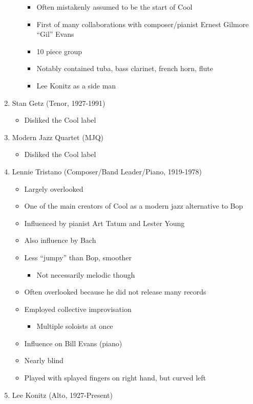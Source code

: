 \documentclass[]{article}
\providecommand{\tightlist}{%
  \setlength{\itemsep}{0pt}\setlength{\parskip}{0pt}}
\begin{document}
\begin{enumerate}
\begin{itemize}
    \begin{itemize}
    \tightlist
    \item
      Often mistakenly assumed to be the start of Cool
    \item
      First of many collaborations with composer/pianist Ernest Gilmore
      ``Gil'' Evans
    \item
      10 piece group
    \item
      Notably contained tuba, bass clarinet, french horn, flute
    \item
      Lee Konitz as a side man
    \end{itemize}
  \end{itemize}
\item
  Stan Getz (Tenor, 1927-1991)

  \begin{itemize}
  \tightlist
  \item
    Disliked the Cool label
  \end{itemize}
\item
  Modern Jazz Quartet (MJQ)

  \begin{itemize}
  \tightlist
  \item
    Disliked the Cool label
  \end{itemize}
\item
  Lennie Tristano (Composer/Band Leader/Piano, 1919-1978)

  \begin{itemize}
  \tightlist
  \item
    Largely overlooked
  \item
    One of the main creators of Cool as a modern jazz alternative to Bop
  \item
    Influenced by pianist Art Tatum and Lester Young
  \item
    Also influence by Bach
  \item
    Less ``jumpy'' than Bop, smoother

    \begin{itemize}
    \tightlist
    \item
      Not necessarily melodic though
    \end{itemize}
  \item
    Often overlooked because he did not release many records
  \item
    Employed collective improvisation

    \begin{itemize}
    \tightlist
    \item
      Multiple soloists at once
    \end{itemize}
  \item
    Influence on Bill Evans (piano)
  \item
    Nearly blind
  \item
    Played with splayed fingers on right hand, but curved left
  \end{itemize}
\item
  Lee Konitz (Alto, 1927-Present)


\end{enumerate}
\end{document}
